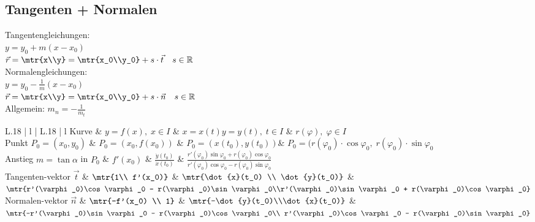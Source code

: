 \documentclass{scrreprt}
\begin{document}
\subsection{Tangenten + Normalen}
Tangentengleichungen:\\
$y=y_0+m(x-x_0)$\\
$\vec{r}=\mtr{x\\y}=\mtr{x_0\\y_0}+s \cdot \vec{t} \quad s\in \mathbb{R}$\\
Normalengleichungen:\\
$y=y_0-\frac{1}{m}(x-x_0)$\\
$\vec{r}=\mtr{x\\y}=\mtr{x_0\\y_0}+s\cdot \vec{n} \quad s \in \mathbb{R}$\\
Allgemein: $m_n=-\frac{1}{m_t}$\\
\begin{tabular}{L{.18} | l | L{.18} | l}
Kurve & $y=f(x),\;x\in I$ & $x=x(t)$\newline $y=y(t), \; t\in I$ & $r(\varphi), \; \varphi \in I$ \\
\hline 
Punkt \newline$P_0=(x_0,y_0)$ & $P_0=(x_0,f(x_0))$ & $P_0=(x(t_0),y(t_0))$& $P_0=(r(\varphi_0)\cdot \cos\varphi_0 , \; r(\varphi_0) \cdot \sin \varphi_0$\\
Anstieg $m=\tan\alpha$ in $P_0$ & $f'(x_0)$ & $\frac{\dot{y}(t_0)}{\dot{x}(t_0)}$ & $\frac{r'(\varphi_0)\sin\varphi_0 + r(\varphi_0)\cos \varphi_0}{r'(\varphi_0)\cos\varphi_0 - r(\varphi_0)\sin \varphi_0}$\\
Tangenten-\newline vektor $\vec{t}$ & $\mtr{1\\ f'(x_0)}$ & $\mtr{\dot{x}(t_0) \\ \dot{y}(t_0)}$ & $\mtr{r'(\varphi_0)\cos\varphi_0 - r(\varphi_0)\sin \varphi_0\\r'(\varphi_0)\sin\varphi_0 + r(\varphi_0)\cos \varphi_0}$\\
Normalen-\newline vektor $\vec{n}$ & $\mtr{-f'(x_0) \\ 1}$ & $\mtr{-\dot{y}(t_0)\\\dot{x}(t_0)}$ & $\mtr{-r'(\varphi_0)\sin\varphi_0 - r(\varphi_0)\cos \varphi_0\\ r'(\varphi_0)\cos\varphi_0 - r(\varphi_0)\sin \varphi_0}$ \\
\end{tabular}\\
\end{document}
